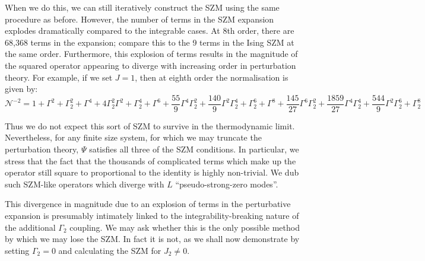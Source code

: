 \documentclass [a4paper, 11pt]{article}
\begin{document}
When we do this, we can still iteratively construct the SZM using the same procedure as before. However, the number of terms in the SZM expansion explodes dramatically compared to the integrable cases. At 8th order, there are 68,368 terms in the expansion; compare this to the 9 terms in the Ising SZM at the same order. Furthermore, this explosion of terms results in the magnitude of the squared operator appearing to diverge with increasing order in perturbation theory. For example, if we set $J = 1$, then at eighth order the normalisation is given by:
\begin{equation}
  \label{eq:gamma2norm}
  \mathcal{N}^{-2} = 1 + \Gamma^{2} + \Gamma_2^{2}  + \Gamma^{4} + 4 \Gamma_2^{2} \Gamma^{2} + \Gamma_2^{4} + \Gamma^{6}+\frac{55}{9} \Gamma^{4} \Gamma_2^{2} + \frac{140}{9} \Gamma^{2} \Gamma_2^{4} + \Gamma_2^{6}+ \Gamma^{8} + \frac{145}{27} \Gamma^{6} \Gamma_2^{2} + \frac{1859}{27} \Gamma^{4} \Gamma_2^{4} + \frac{544}{9} \Gamma^{2} \Gamma_2^{6}+ \Gamma_2^{8}
\end{equation}

Thus we do not expect this sort of SZM to survive in the thermodynamic limit. Nevertheless, for any finite size system, for which we may truncate the perturbation theory, $\Psi$ satisfies all three of the SZM conditions. In particular, we stress that the fact that the thousands of complicated terms which make up the operator still square to proportional to the identity is highly non-trivial. We dub such SZM-like operators which diverge with $L$ ``pseudo-strong-zero modes''.

This divergence in magnitude due to an explosion of terms in the perturbative expansion is presumably intimately linked to the integrability-breaking nature of the additional $\Gamma_2$ coupling. We may ask whether this is the only possible method by which we may lose the SZM. In fact it is not, as we shall now demonstrate by setting $\Gamma_2=0$ and calculating the SZM for $J_2 \neq 0$.
\end{document}
